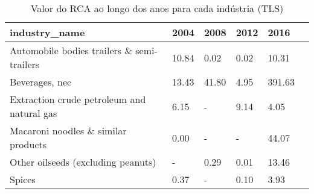 \begin{table}
\centering
\caption{Valor do RCA ao longo dos anos para cada indústria (TLS)}
\begin{tabular}{p{6cm}p{1.5cm}p{1.5cm}p{1.5cm}p{1.5cm}p{1.5cm}}
\toprule
                             industry\_name &  2004 &  2008 & 2012 &   2016 \\
\midrule
Automobile bodies trailers \& semi-trailers & 10.84 &  0.02 & 0.02 &  10.31 \\
                            Beverages, nec & 13.43 & 41.80 & 4.95 & 391.63 \\
Extraction crude petroleum and natural gas &  6.15 &     - & 9.14 &   4.05 \\
       Macaroni noodles \& similar products &  0.00 &     - &    - &  44.07 \\
        Other oilseeds (excluding peanuts) &     - &  0.29 & 0.01 &  13.46 \\
                                    Spices &  0.37 &     - & 0.10 &   3.93 \\
\bottomrule
\end{tabular}
\end{table}
